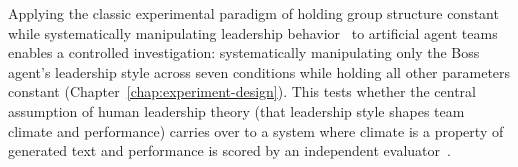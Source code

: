 Applying the classic experimental paradigm of holding group structure constant while systematically manipulating leadership behavior~\cite{lewin1939patterns} to artificial agent teams enables a controlled investigation: systematically manipulating only the Boss agent's leadership style across seven conditions while holding all other parameters constant (Chapter~\ref{chap:experiment-design}).
This tests whether the central assumption of human leadership theory (that leadership style shapes team climate and performance) carries over to a system where climate is a property of generated text and performance is scored by an independent evaluator~\cite{goleman2000leadership}.
